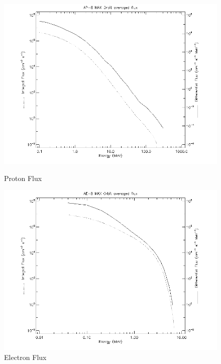 \begin{figure}[!htbp]
  \centering
  \begin{minipage}[b]{0.45\textwidth}
    \includegraphics[width=\textwidth]{spenvis/max_prot}
    \caption{Proton Flux}
    \label{fig:p_flux}
  \end{minipage}
  \hfill
  \begin{minipage}[b]{0.45\textwidth}
    \includegraphics[width=\textwidth]{spenvis/max_elec}
    \caption{Electron Flux}
    \label{fig:e_flux}
  \end{minipage}
\end{figure}

